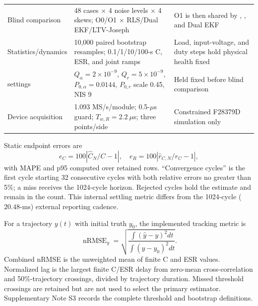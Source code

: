 \begin{table}[t]
\begin{tabular}{p{3.0cm}p{6.0cm}p{6.6cm}}
Blind comparison & 48 cases $\times$ 4 noise levels $\times$ 4 skews; O0/O1 $\times$ RLS/Dual EKF/LTV-Joseph & O1 is then shared by \TSRLS{}, \TSKF{}, and Dual EKF \\
Statistics/dynamics & 10,000 paired bootstrap resamples; 0.1/1/10/100-s C, ESR, and joint ramps & Load, input-voltage, and duty steps hold physical health fixed \\
\TSKF{} settings & $Q_\alpha=2\times10^{-9}$, $Q_r=5\times10^{-9}$, $P_{0,\alpha}=0.0144$, $P_{0,r}$ scale 0.45, NIS 9 & Held fixed before blind comparison \\
Device acquisition & 1.093 MS/s/module; 0.5-$\mu$s guard; $T_{w,R}=2.2~\mu$s; three points/side & Constrained F28379D simulation only \\
\bottomrule
\end{tabular}
\end{table}

Static endpoint errors are
\begin{equation}
e_C=100\left|\hat C_N/C-1\right|,\quad
e_R=100\left|\hat r_{C,N}/r_C-1\right|,
\end{equation}
with MAPE and p95 computed over retained rows. ``Convergence cycles'' is the first cycle starting 32 consecutive cycles with both relative errors no greater than 5\%; a miss receives the 1024-cycle horizon. Rejected cycles hold the estimate and remain in the count. This internal settling metric differs from the 1024-cycle ($20.48$-ms) external reporting cadence.

For a trajectory $y(t)$ with initial truth $y_0$, the implemented tracking metric is
\begin{equation}
\operatorname{nRMSE}_y=
\sqrt{\frac{\int(\hat y-y)^2dt}{\int(y-y_0)^2dt}}.
\end{equation}
Combined nRMSE is the unweighted mean of finite C and ESR values. Normalized lag is the largest finite C/ESR delay from zero-mean cross-correlation and 50\%-trajectory crossings, divided by trajectory duration. Missed threshold crossings are retained but are not used to select the primary estimator. Supplementary Note S3 records the complete threshold and bootstrap definitions.
